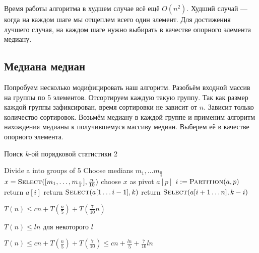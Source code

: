 \documentclass[12pt,a4paper]{article}
\begin{document}
Время работы алгоритма в худшем случае всё ещё $O(n^2)$.
Худший случай — когда на каждом шаге мы отщеплем всего один элемент.
Для достижения лучшего случая, на каждом шаге нужно выбирать в качестве опорного элемента медиану.

\subsection*{Медиана медиан}
Попробуем несколько модифицировать наш алгоритм.
Разобьём входной массив на группы по 5 элементов.
Отсортируем каждую такую группу.
Так как размер каждой группы зафиксирован, время сортировки не зависит от $n$.
Зависит только количество сортировок.
Возьмём медиану в каждой группе и применим алгоритм нахождения медианы к получившемуся массиву медиан.
Выберем её в качестве опорного элемента.

\begin{algorithm}
\caption{Поиск $k$-ой порядковой статистики 2}
\begin{algorithmic}[1]
	\State Divide a into groups of 5
	\State Choose medians $m_1,\ldots m_\frac{n}{5}$
	\State $x = \textsc{Select}([m_1,\ldots, m_\frac{n}{5}], \frac{n}{10})$
	\State choose $x$ as pivot $a[p]$
	\State $i \mathrel{:=} \textsc{Partition}(a, p)$
		\State return $a[i]$	
	\EndIf
		\State return $\textsc{Select}(a[1 \ldots i - 1], k)$
	\Else
		\State return $\textsc{Select}(a[i + 1 \ldots n], k - i)$
	\EndIf
\EndFunction
\end{algorithmic}
\end{algorithm}

$T(n) \leqslant cn + T\left(\frac{n}{5}\right) + T\left( \frac{7}{10}n \right)$

$T(n) \leqslant ln$ для некоторого $l$

$T(n) \leqslant cn + T(\frac{n}{5}) + T(\frac{7}{10}) \leqslant cn + \frac{ln}{5} + \frac{7}{10}ln$
\end{document}
